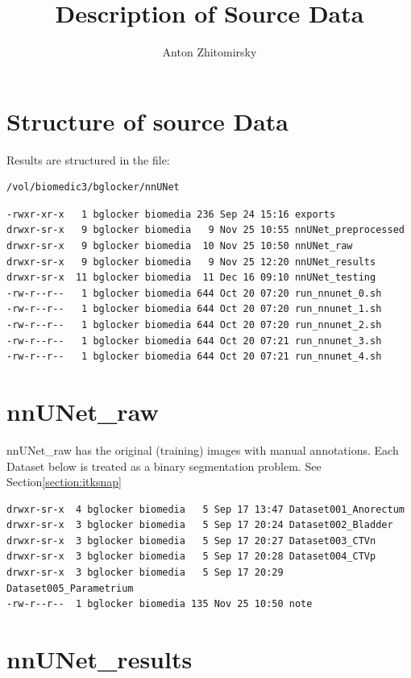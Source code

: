 \documentclass[11pt]{article}
\title{Description of Source Data}
\author{Anton Zhitomirsky}
\begin{document}
\maketitle

\section{Structure of source Data}

Results are structured in the file:

\begin{lstlisting}[language=bash]
/vol/biomedic3/bglocker/nnUNet
\end{lstlisting}

\begin{lstlisting}[language=inform]
-rwxr-xr-x   1 bglocker biomedia 236 Sep 24 15:16 exports
drwxr-sr-x   9 bglocker biomedia   9 Nov 25 10:55 nnUNet_preprocessed
drwxr-sr-x   9 bglocker biomedia  10 Nov 25 10:50 nnUNet_raw
drwxr-sr-x   9 bglocker biomedia   9 Nov 25 12:20 nnUNet_results
drwxr-sr-x  11 bglocker biomedia  11 Dec 16 09:10 nnUNet_testing
-rw-r--r--   1 bglocker biomedia 644 Oct 20 07:20 run_nnunet_0.sh
-rw-r--r--   1 bglocker biomedia 644 Oct 20 07:20 run_nnunet_1.sh
-rw-r--r--   1 bglocker biomedia 644 Oct 20 07:20 run_nnunet_2.sh
-rw-r--r--   1 bglocker biomedia 644 Oct 20 07:21 run_nnunet_3.sh
-rw-r--r--   1 bglocker biomedia 644 Oct 20 07:21 run_nnunet_4.sh
\end{lstlisting}

\section{nnUNet\_raw}\label{section:raw}

nnUNet\_raw has the original (training) images with manual annotations. Each Dataset below is treated as a binary segmentation problem. See Section\ref{section:itksnap}

\begin{lstlisting}[language=inform]
drwxr-sr-x  4 bglocker biomedia   5 Sep 17 13:47 Dataset001_Anorectum
drwxr-sr-x  3 bglocker biomedia   5 Sep 17 20:24 Dataset002_Bladder
drwxr-sr-x  3 bglocker biomedia   5 Sep 17 20:27 Dataset003_CTVn
drwxr-sr-x  3 bglocker biomedia   5 Sep 17 20:28 Dataset004_CTVp
drwxr-sr-x  3 bglocker biomedia   5 Sep 17 20:29 Dataset005_Parametrium
-rw-r--r--  1 bglocker biomedia 135 Nov 25 10:50 note
\end{lstlisting}

\section{nnUNet\_results}
\end{document}

